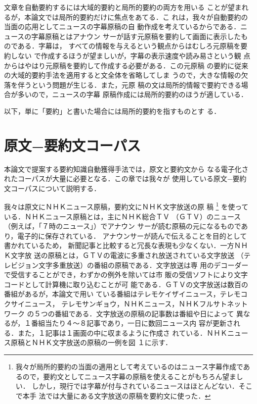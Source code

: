 文章を自動要約するには大域的要約と局所的要約の両方を用いる
ことが望まれるが，本論文では局所的要約だけに焦点をあてる．こ
れは，我々が自動要約の当面の応用としてニュースの字幕原稿の自
動作成を考えているからである．ニュースの字幕原稿とはアナウン
サーが話す元原稿を要約して画面に表示したものである．字幕は，
すべての情報を与えるという観点からはむしろ元原稿を要約しない
で作成するほうが望ましいが，字幕の表示速度や読み易さという観
点からはやはり元原稿を要約して作成する必要がある．この元原稿
の要約に従来の大域的要約手法を適用すると文全体を省略してしま
うので，大きな情報の欠落を伴うという問題が生じる．また，元原
稿の文は局所的情報で要約できる場合が多いので，ニュースの字幕
原稿作成には局所的要約のほうが適している．

以下，単に「要約」と書いた場合には局所的要約を指すものとす
る．

\section{原文−要約文コーパス}
\label{sec:sec3}
本論文で提案する要約知識自動獲得手法では，原文と要約文から
なる電子化されたコーパスが大量に必要となる．この章では我々が
使用している原文−要約文コーパスについて説明する．

我々は原文にＮＨＫニュース原稿，要約文にＮＨＫ文字放送の原
稿
\footnote{
我々が局所的要約の当面の適用として考えているのはニュース字幕作成であ
るので，要約文としてニュース字幕の原稿を使えることがもちろん望ましい．
しかし，現行では字幕が付与されているニュースはほとんどない．そこで本手
法では大量にある文字放送の原稿を要約文に使った．
}
を使っている．ＮＨＫニュース原稿とは，主にＮＨＫ総合ＴＶ
（ＧＴＶ）のニュース（例えば，「７時のニュース」）でアナウン
サーが読む原稿の元になるものであり，電子的に保存されている．
アナウンサーが読んで伝えることを目的として書かれているため，
新聞記事と比較すると冗長な表現も少なくない．一方ＮＨＫ文字放
送の原稿とは，ＧＴＶの電波に多重され放送されている文字放送
（テレビジョン文字多重放送）の番組の原稿である．文字放送は専
用のデコーダーで受信することができ，わずかの例外を除いては市
販の受信ソフトにより文字コードとして計算機に取り込むことが可
能である．ＧＴＶの文字放送は数百の番組があるが，本論文で用い
ている番組はテレモケイザイニュース，テレモコクサイニュース，
テレモサンギョウ，ＮＨＫニュース，ＮＨＫフルサトネットワーク
の５つの番組である．文字放送の原稿の記事数は番組や日によって
異なるが，１番組当たり４〜８記事であり，一日に数回ニュース内
容が更新される．また，１記事は１画面の中に収まるように作成さ
れている．ＮＨＫニュース原稿とＮＨＫ文字放送の原稿の一例を図
１に示す．

